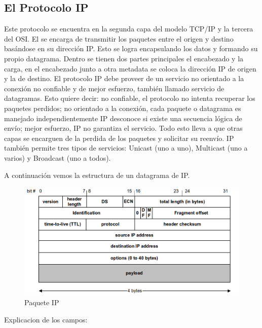 \documentclass[11pt,a4paper]{article}
\begin{document}
\subsection{El Protocolo IP}
Este protocolo se encuentra en la segunda capa del modelo TCP/IP y la tercera del OSI. El se encarga
de transmitir los paquetes entre el origen y destino basándose en su dirección IP. Esto se logra
encapsulando los datos y formando su propio datagrama. Dentro se tienen dos partes principales el
encabezado y la carga, en el encabezado junto a otra metadata se coloca la dirección IP de origen y 
la de destino. El protocolo IP debe proveer de un servicio no orientado a la conexión no confiable y 
de mejor esfuerzo, también llamado servicio de datagramas. Esto quiere decir: no confiable, el 
protocolo no intenta recuperar los paquetes perdidos; no orientado a la conexión, cada paquete o 
datagrama es manejado independientemente IP desconoce si existe una secuencia lógica de envío; mejor
esfuerzo, IP no garantiza el servicio. Todo esto lleva a que otras capas se encarguen de la perdida
de los paquetes y solicitar su reenvío. IP también permite tres tipos de servicios: Unicast (uno a 
uno), Multicast (uno a varios) y Broadcast (uno a todos).\par
A continuación vemos la estructura de un datagrama de IP.
\begin{figure}[h!]
 \centering
 \includegraphics[width=1\textwidth]{ipDatagram.png}
 \caption[Paquete IP]{Paquete IP}
\end{figure}\par
Explicacion de los campos:\par
\end{document}
